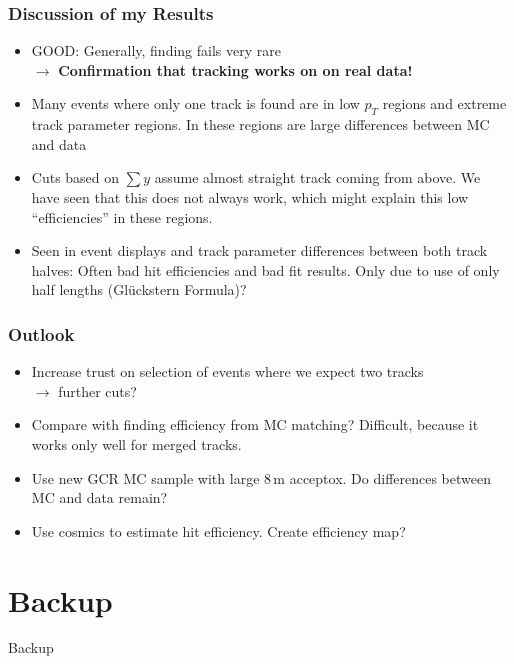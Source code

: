 \documentclass[18pt]{beamer}
\begin{document}
\begin{frame}
  \frametitle{Discussion of my Results}
  \begin{itemize}
  \item GOOD: Generally, finding fails very rare\\
    $\rightarrow$  \textbf{Confirmation that tracking works on on real data!}
  \item Many events where only one track is found are in low $p_T$ regions and extreme track parameter regions.
    In these regions are large differences between MC and data
  \item Cuts based on $\sum y$ assume almost straight track coming from above. We have seen that this does not always work, which might explain this low ``efficiencies'' in these regions.
  \item Seen in event displays and track parameter differences between both track halves:
    Often bad hit efficiencies and bad fit results. Only due to use of only half lengths (Glückstern Formula)?
  \end{itemize}
  
\end{frame}

\begin{frame}
  \frametitle{Outlook}
  \begin{itemize}
  \item Increase trust on selection of events where we expect two tracks
    \\$\rightarrow$ further cuts?
  \item Compare with finding efficiency from MC matching? Difficult, because it works only well for merged tracks.
  \item Use new GCR MC sample with large 8\,m acceptox. Do differences between MC and data remain?
  \item Use cosmics to estimate hit efficiency. Create efficiency map?
  \end{itemize}
\end{frame}

\section{Backup}

\begin{frame}
  \begin{center}
    \huge Backup
  \end{center}
\end{frame}
\end{document}
